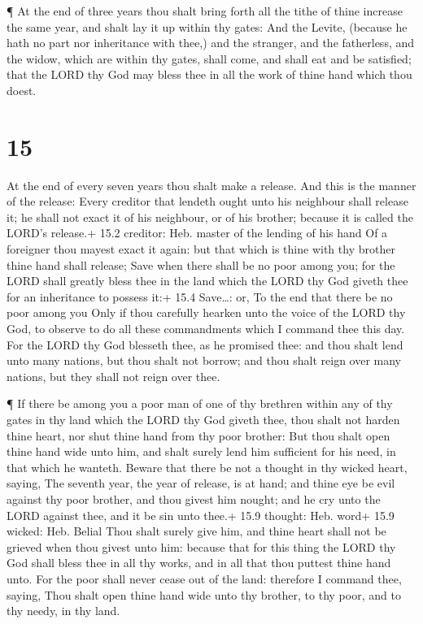  ¶ At the end of three years thou shalt bring forth all the
tithe of thine increase the same year, and shalt lay it up within thy
gates:  And the Levite, (because he hath no part nor
inheritance with thee,) and the stranger, and the fatherless, and the
widow, which are within thy gates, shall come, and shall eat and be
satisfied; that the LORD thy God may bless thee in all the work of thine
hand which thou doest.

\hypertarget{section-14}{%
\section{15}\label{section-14}}

 At the end of every seven years thou shalt make a release.
 And this is the manner of the release: Every creditor that
lendeth ought unto his neighbour shall release it; he shall not exact it
of his neighbour, or of his brother; because it is called the LORD's
release.+ 15.2 creditor: Heb. master of the lending of his hand
 Of a foreigner thou mayest exact it again: but that which
is thine with thy brother thine hand shall release;  Save
when there shall be no poor among you; for the LORD shall greatly bless
thee in the land which the LORD thy God giveth thee for an inheritance
to possess it:+ 15.4 Save\ldots: or, To the end that there be no poor
among you  Only if thou carefully hearken unto the voice of
the LORD thy God, to observe to do all these commandments which I
command thee this day.  For the LORD thy God blesseth thee,
as he promised thee: and thou shalt lend unto many nations, but thou
shalt not borrow; and thou shalt reign over many nations, but they shall
not reign over thee.

 ¶ If there be among you a poor man of one of thy brethren
within any of thy gates in thy land which the LORD thy God giveth thee,
thou shalt not harden thine heart, nor shut thine hand from thy poor
brother:  But thou shalt open thine hand wide unto him, and
shalt surely lend him sufficient for his need, in that which he wanteth.
 Beware that there be not a thought in thy wicked heart,
saying, The seventh year, the year of release, is at hand; and thine eye
be evil against thy poor brother, and thou givest him nought; and he cry
unto the LORD against thee, and it be sin unto thee.+ 15.9 thought: Heb.
word+ 15.9 wicked: Heb. Belial  Thou shalt surely give him,
and thine heart shall not be grieved when thou givest unto him: because
that for this thing the LORD thy God shall bless thee in all thy works,
and in all that thou puttest thine hand unto.  For the poor
shall never cease out of the land: therefore I command thee, saying,
Thou shalt open thine hand wide unto thy brother, to thy poor, and to
thy needy, in thy land.


